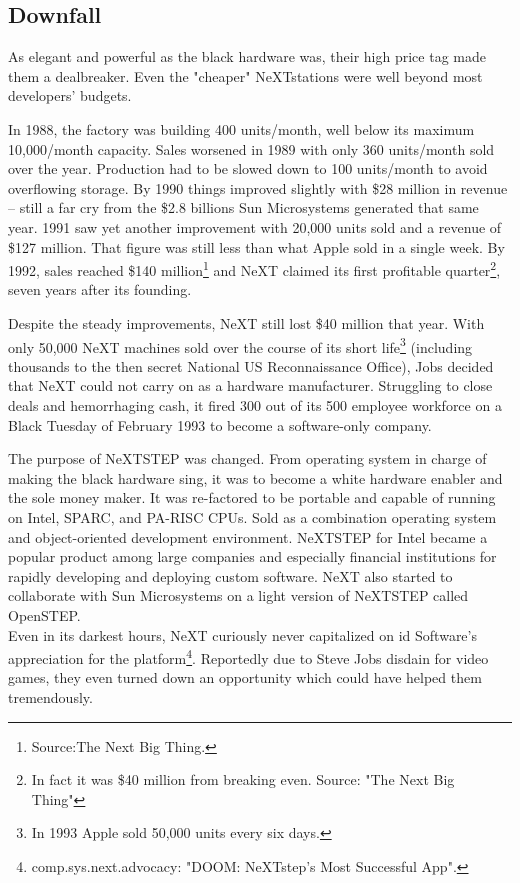 \subsection{Downfall}
As elegant and powerful as the black hardware was, their high price tag made them a dealbreaker. Even the "cheaper" NeXTstations were well beyond most developers' budgets.\\
\par
 In 1988, the factory was building 400 units/month, well below its maximum 10,000/month capacity. Sales worsened in 1989 with only 360 units/month sold over the year. Production had to be slowed down to 100 units/month to avoid overflowing storage. By 1990 things improved slightly with \$28 million in revenue -- still a far cry from the \$2.8 billions Sun Microsystems generated that same year. 1991 saw yet another improvement with 20,000 units sold and a revenue of \$127 million. That figure was still less than what Apple sold in a single week. By 1992, sales reached \$140 million\footnote{Source:The Next Big Thing.} and NeXT claimed its first profitable quarter\footnote{In fact it was \$40 million from breaking even. Source: "The Next Big Thing"}, seven years after its founding.\\
\par
Despite the steady improvements, NeXT still lost \$40 million that year. With only 50,000 NeXT machines sold over the course of its short life\footnote{In 1993 Apple sold 50,000 units every six days.} (including thousands to the then secret National US Reconnaissance Office), Jobs decided that NeXT could not carry on as a hardware manufacturer. Struggling to close deals and hemorrhaging cash, it fired 300 out of its 500 employee workforce on a Black Tuesday of February 1993 to become a software-only company.\\
\par
 The purpose of NeXTSTEP was changed. From operating system in charge of making the black hardware sing, it was to become a white hardware enabler and the sole money maker. It was re-factored to be portable and capable of running on Intel, SPARC, and PA-RISC CPUs. Sold as a combination operating system and object-oriented development environment. NeXTSTEP for Intel became a popular product among large companies and especially financial institutions for rapidly developing and deploying custom software. NeXT also started to collaborate with Sun Microsystems on a light version of NeXTSTEP called OpenSTEP.\\
Even in its darkest hours, NeXT curiously never capitalized on id Software's appreciation for the platform\footnote{comp.sys.next.advocacy: "DOOM: NeXTstep's Most Successful App".}. Reportedly due to Steve Jobs disdain for video games, they even turned down an opportunity which could have helped them tremendously.\\
\par

